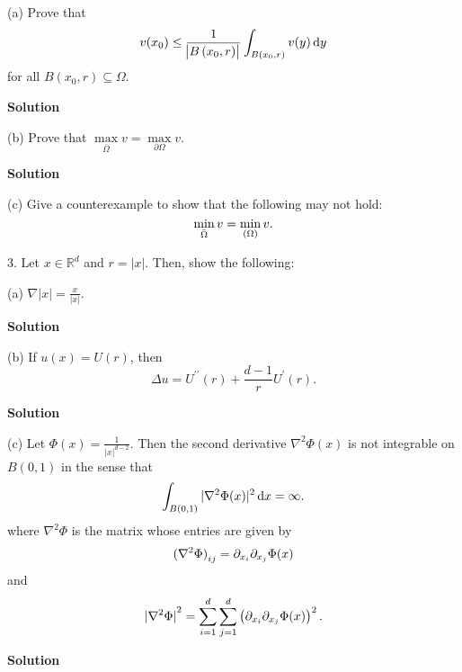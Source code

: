 \documentclass{article}
\begin{document}
(a) Prove that
%
\begin{equation*}
    v(x_0) \leq \frac{1}{\envert{B\del{x_0, r}}} \int_{B(x_0, r)} v(y) \dif y
\end{equation*}
%
for all $B(x_0, r) \subseteq \Omega$.

\textbf{Solution}

\vspace{5mm}

(b) Prove that $\max\limits_{\bar{\Omega}} v = \max\limits_{\partial \Omega} v$.

\textbf{Solution}

\vspace{5mm}

(c) Give a counterexample to show that the following may not hold:
%
\begin{equation*}
    \min_{\bar \Omega} v = \min_{\del\Omega} v
    .
\end{equation*}

\newpage

3. Let $x \in \mathbb{R}^d$ and $r = |x|$. Then, show the following:

(a) $\nabla |x| = \frac{x}{|x|}$.

\textbf{Solution}

\vspace{5mm}

(b) If $u(x) = U(r)$, then
%
\begin{equation*}
    \Delta u = U^{\prime \prime}(r) + \frac{d - 1}{r} U^\prime(r).
\end{equation*}

\textbf{Solution}

\vspace{5mm}

(c) Let $\Phi(x) = \frac{1}{|x|^{d-2}}$. Then the second derivative
$\nabla^2 \Phi(x)$ is not integrable on $B(0, 1)$ in the sense that
%
\begin{equation*}
    \int_{B(0, 1)} |\nabla^2 \Phi(x)|^2 \dif x = \infty.
\end{equation*}
%
where $\nabla^2 \Phi$ is the matrix whose entries are given by
%
\begin{equation*}
    \del[0]{\nabla^2 \Phi}_{ij} = \partial_{x_i} \partial_{x_j} \Phi(x)
\end{equation*}
%
and
%
\begin{equation*}
    \envert[0]{\nabla^2 \Phi}^2
        = \sum_{i=1}^d \sum_{j=1}^d \del{\partial_{x_i} \partial_{x_j} \Phi(x)}^2
    .
\end{equation*}

\textbf{Solution}
\end{document}
